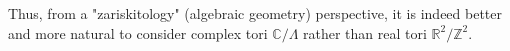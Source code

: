 \documentclass[11pt,openany]{article}
\begin{document}
Thus, from a "zariskitology" (algebraic geometry) perspective, it is indeed better and more natural to consider complex tori \(\mathbb{C}/\Lambda\) rather than real tori \(\mathbb{R}^2/\mathbb{Z}^2\).

%	
%	
%	
\end{document}
